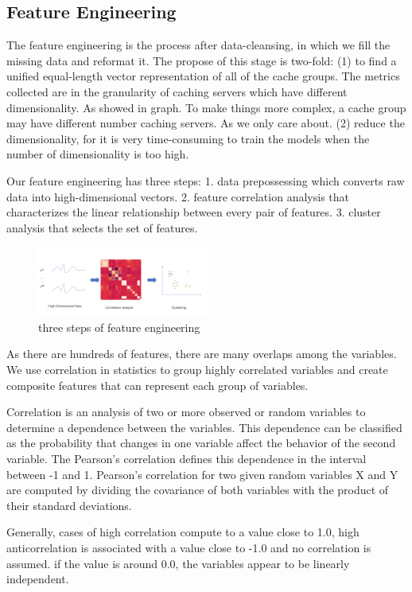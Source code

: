 \documentclass[5p]{elsarticle}
\begin{document}
\subsection{Feature Engineering}
The feature engineering is the process after data-cleansing, in which we fill the missing data and reformat it. The propose of this stage is two-fold:
(1) to find a unified equal-length vector representation of all of the cache groups. 
The metrics collected are in the granularity of caching servers which have different dimensionality. As showed in graph. To make things more complex, a cache group may have different number caching servers. As we only care about. 
(2) reduce the dimensionality, for it is very time-consuming to train the models when the number of dimensionality is too high.

Our feature engineering has three steps: 1. data prepossessing which converts raw data into high-dimensional vectors. 2. feature correlation analysis that characterizes the linear relationship between every pair of features. 3. cluster analysis that selects the set of features.

\begin{figure}[h]
    \centering
    \includegraphics[width=0.5\textwidth]{feature_engineering.png}
    \caption{three steps of feature engineering}
    \label{fig:Correlation_matrix}
\end{figure}

As there are hundreds of features, there are many overlaps among the variables. We use correlation in statistics to group highly correlated variables and create composite features that can represent each group of variables.

Correlation is an analysis of two or more observed or random variables to determine a dependence between the variables. This dependence can be classified as the probability that changes in one variable affect the behavior of the second variable. The Pearson’s correlation defines this dependence in the interval between -1 and 1. Pearson’s correlation for two given random variables X and Y are computed by dividing the covariance of both variables with the product of their standard deviations.

Generally, cases of high correlation compute to a value close to 1.0, high anticorrelation is associated with a value close to -1.0 and no correlation is assumed. if the value is around 0.0, the variables appear to be linearly independent. 
\end{document}
